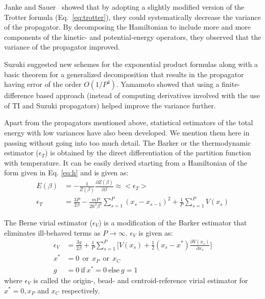         Janke and Sauer~\cite{Janke1992} showed that by adopting a slightly modified version of the Trotter formula (Eq.~\eqref{eq:trotter}), they could systematically decrease the variance of the propagator. By decomposing the Hamiltonian to include more and more components of the kinetic- and potential-energy operators, they observed that the variance of the propagator improved.

        Suzuki \cite{Suzuki1995} suggested new schemes for the exponential product formulas along with a basic theorem for a generalized decomposition that results in the propagator having error of the order $O(1/P^4)$. Yamamoto \cite{Yamamoto2005} showed that using a finite-difference based approach (instead of computing derivatives involved with the use of TI and Suzuki propagators) helped improve the variance further.
        
        Apart from the propagators mentioned above, statistical estimators of the total energy with low variances have also been developed. We mention them here in passing without going into too much detail. The Barker or the thermodynamic estimator\cite{Barker1979} ($\epsilon_T$) is obtained by the direct differentiation of the partition function with temperature. It can be easily derived starting from a Hamiltonian of the form given in Eq. \eqref{eq:h} and is given as:
        \begin{equation}\label{eT}
            \begin{aligned}
                E(\beta) &= - \displaystyle\frac{1}{Z(\beta)} \frac{\partial Z(\beta)}{\partial \beta} \approx <\epsilon_T>\\
                \epsilon_T &= \displaystyle\frac{3P}{2\beta} - \frac{mP}{2\hbar^2 \beta^2} \sum\limits_{s=1}^P (x_s - x_{s-1})^2 + \frac{1}{P} \sum\limits_{s=1}^P V(x_s)
            \end{aligned}
        \end{equation}

        The Berne virial estimator\cite{Cao1989} ($\epsilon_V$) is a modification of the Barker estimator that eliminates ill-behaved terms  as $P \to \infty$. $\epsilon_V$ is given as:
        \begin{equation}\label{eV}
            \begin{aligned}
                \epsilon_V &= \displaystyle\frac{3g}{2\beta} + \frac{1}{P} \sum\limits_{s=1}^P \bigg[ V(x_s) + \frac{1}{2} (x_s - x^*) \frac{\partial V(x_s)}{\partial x_s} \bigg]\\
                x^* &= 0\: \: \text{or}\:\: x_P \: \:\text{or} \:\: x_C\\
                g &= 0 ~\text{if}~ x^* = 0~ \text{else}~ g = 1
            \end{aligned}
        \end{equation}
        where $\epsilon_V$ is called the origin-, bead- and centroid-reference virial estimator for $x^* = 0, x_P$ and $x_C$ respectively.

